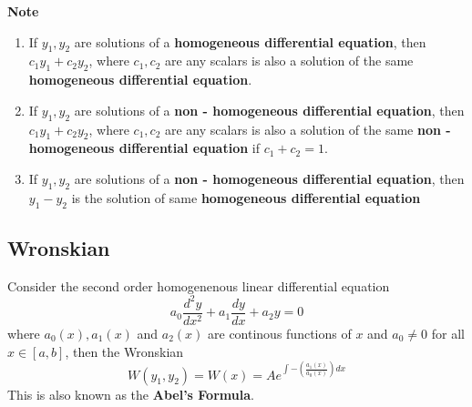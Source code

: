 \documentclass[a4paper, titlepage]{article}
\begin{document}
            \textbf{Note}
            \begin{enumerate}
                \item If $y_1, y_2$ are solutions of a \textbf{homogeneous 
                differential equation}, then $c_1y_1 + c_2y_2$, where
                $c_1, c_2$ are any scalars is also a solution of the 
                same \textbf{homogeneous differential equation}.
                \item If $y_1, y_2$ are solutions of a \textbf{non - 
                homogeneous differential equation}, then $c_1y_1 + c_2y_2$, 
                where $c_1, c_2$ are any scalars is also a solution of the 
                same \textbf{non - homogeneous differential equation} if
                $c_1 + c_2 = 1$.
                \item If $y_1, y_2$ are solutions of a \textbf{non - homogeneous differential equation}, then 
                $y_1 - y_2$ is the solution of same 
                \textbf{homogeneous differential equation}
                
            \end{enumerate}

        \subsection{Wronskian}
        Consider the second order homogenenous linear differential equation 
        \begin{equation}
            \label{solde}
            a_0\dfrac{d^2y}{dx^2} + a_1\dfrac{dy}{dx} + a_2y = 0
        \end{equation}
        where $a_0(x), a_1(x)$ and $a_2(x)$ are continous functions of
        $x$ and $a_0 \neq 0$ for all $x \in [a, b]$, then the Wronskian 
        \[ W(y_1, y_2) = W(x) = Ae^{\int -\left( \frac{a_1(x)}{a_0(x)} \right)dx } \]
        This is also known as the \textbf{Abel's Formula}. 
\end{document}
